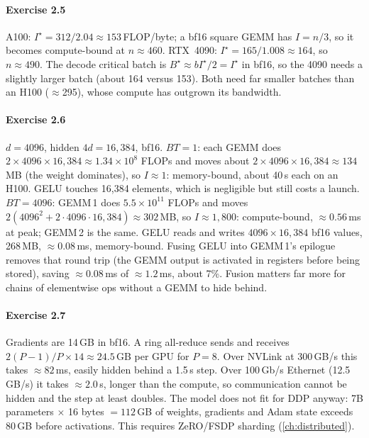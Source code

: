 \paragraph{Exercise 2.5}
A100: $I^\star=312/2.04\approx153$\,FLOP/byte; a bf16 square GEMM has $I=n/3$, so it becomes compute-bound at
$n\approx460$. RTX~4090: $I^\star=165/1.008\approx164$, so $n\approx490$. The decode critical batch is
$B^\star\approx bI^\star/2=I^\star$ in bf16, so the 4090 needs a slightly larger batch (about 164 versus 153). Both need
far smaller batches than an H100 ($\approx$295), whose compute has outgrown its bandwidth.

\paragraph{Exercise 2.6}
$d=4096$, hidden $4d=16{,}384$, bf16. \emph{$BT=1$}: each GEMM does $2\times4096\times16{,}384\approx1.34\times10^8$ FLOPs and
moves about $2\times4096\times16{,}384\approx134$\,MB (the weight dominates), so $I\approx1$: memory-bound, about 40\,\textmu s each on an
H100. GELU touches 16{,}384 elements, which is negligible but still costs a launch. \emph{$BT=4096$}: GEMM\,1 does $5.5\times10^{11}$
FLOPs and moves $2(4096^2+2\cdot4096\cdot16{,}384)\approx302$\,MB, so $I\approx1{,}800$: compute-bound, $\approx0.56$\,ms at peak; GEMM\,2
is the same. GELU reads and writes $4096\times16{,}384$ bf16 values, 268\,MB, $\approx0.08$\,ms, memory-bound. Fusing GELU into
GEMM\,1's epilogue removes that round trip (the GEMM output is activated in registers before being stored),
saving $\approx0.08$\,ms of $\approx1.2$\,ms, about 7\%. Fusion matters far more for chains of elementwise ops without a GEMM to
hide behind.

\paragraph{Exercise 2.7}
Gradients are 14\,GB in bf16. A ring all-reduce sends and receives $2(P-1)/P\times14\approx24.5$\,GB per GPU for $P=8$. Over
NVLink at 300\,GB/s this takes $\approx82$\,ms, easily hidden behind a 1.5\,s step. Over 100\,Gb/s Ethernet (12.5\,GB/s) it takes
$\approx2.0$\,s, longer than the compute, so communication cannot be hidden and the step at least doubles. The model does
not fit for DDP anyway: 7B parameters $\times$ 16 bytes $=112$\,GB of weights, gradients and Adam state exceeds 80\,GB before
activations. This requires ZeRO/FSDP sharding (\cref{ch:distributed}).

